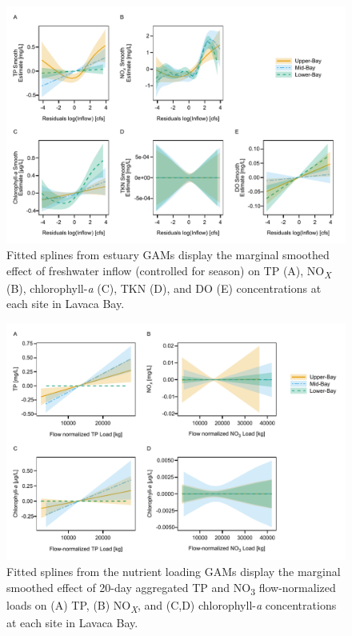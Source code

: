 \documentclass[fleqn,10pt,lineno]{wlpeerj} %
\begin{document}
\begin{figure}

{\centering \includegraphics[width=1\linewidth,]{Schramm-2023-08-PeerJ_files/figure-latex/fig6} 

}

\caption{Fitted splines from estuary GAMs display the marginal smoothed effect of freshwater inflow (controlled for season) on TP (A), NO\textit{\textsubscript{X}} (B), chlorophyll-\textit{a} (C), TKN (D), and DO (E) concentrations at each site in Lavaca Bay.}\label{fig:fig6}
\end{figure}

\begin{figure}

{\centering \includegraphics[width=1\linewidth,]{Schramm-2023-08-PeerJ_files/figure-latex/fig7} 

}

\caption{Fitted splines from the nutrient loading GAMs display the marginal smoothed effect of 20-day aggregated TP and NO\textsubscript{3} flow-normalized loads on (A) TP, (B) NO\textsubscript{\textit{X}}, and (C,D) chlorophyll-\textit{a} concentrations at each site in Lavaca Bay.}\label{fig:fig7}
\end{figure}
\end{document}
